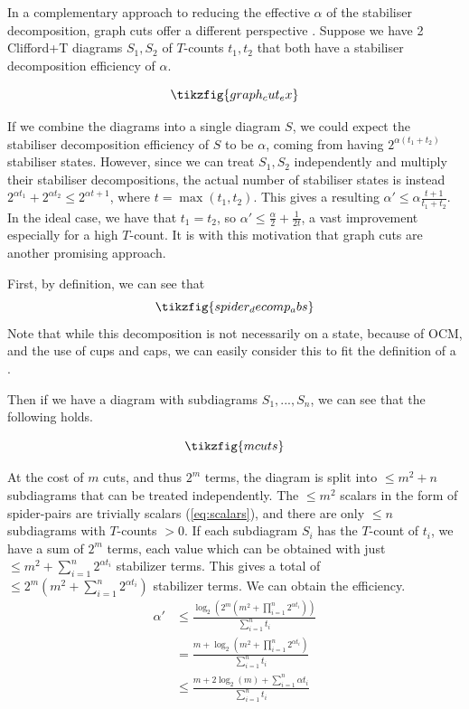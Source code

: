 In a complementary approach to reducing the effective $\alpha$ of the stabiliser decomposition, 
graph cuts offer a different perspective \cite{Codsi2022}.
Suppose we have 2 Clifford+T diagrams $S_1, S_2$ of $T$-counts $t_1,t_2$ that both 
have a stabiliser decomposition efficiency of $\alpha$.

\begin{equation}
    \label{eq:graph-cut-ex}
    \tikzfig{graph_cut_ex}
\end{equation}

If we combine the diagrams into a single diagram $S$,
we could expect the stabiliser decomposition efficiency of $S$ to be $\alpha$,
coming from having $2^{\alpha(t_1+t_2)}$ stabiliser states.
However, since we can treat $S_1,S_2$ independently and multiply their stabiliser decompositions,
the actual number of stabiliser states is instead $2^{\alpha t_1} + 2^{\alpha t_2} \leq 2^{\alpha t + 1}$,
where $t=\max(t_1,t_2)$.
This gives a resulting $\alpha' \leq \alpha \frac{t + 1}{t_1+t_2}$.
In the ideal case, we have that $t_1=t_2$, so $\alpha' \leq \frac{\alpha}{2} + \frac{1}{2t}$, 
a vast improvement especially for a high $T$-count.
It is with this motivation that graph cuts are another promising approach.

First, by definition, we can see that 
\begin{equation}
    \label{eq:spider-cut}
    \tikzfig{spider_decomp_abs}
\end{equation}
Note that while this decomposition \CutRule is not necessarily on a state,
because of OCM, and the use of cups and caps, we can easily consider this to fit 
the definition of a . 

Then if we have a diagram with subdiagrams $S_1,...,S_n$, we can see that the following holds.

\begin{equation}
    \label{eq:mcuts}
    \tikzfig{mcuts}
\end{equation}

At the cost of $m$ cuts, and thus $2^m$ terms, 
the diagram is split into $\leq m^2 + n$ subdiagrams that can be treated independently.
The $\leq m^2$ scalars in the form of spider-pairs are trivially scalars (\ref{eq:scalars}),
and there are only $\leq n$ subdiagrams with $T$-counts $>0$.
If each subdiagram $S_i$ has the $T$-count of $t_i$,
we have a sum of $2^m$ terms, each value which can be obtained with just $\leq m^2 + \sum_{i=1}^n 2^{\alpha t_i}$ stabilizer terms.
This gives a total of $\leq 2^m(m^2 + \sum_{i=1}^n 2^{\alpha t_i})$ stabilizer terms.
We can obtain the efficiency.
\begin{equation}
\begin{aligned}
    \alpha' &\leq \frac{\log_2 (2^m(m^2 + \prod_{i=1}^n 2^{\alpha t_i}))}{\sum_{i=1}^n t_i}\\
    &= \frac{m + \log_2(m^2 + \prod_{i=1}^n 2^{\alpha t_i})}{\sum_{i=1}^n t_i}\\
    &\leq \frac{m + 2\log_2(m) + \sum_{i=1}^n \alpha t_i}{\sum_{i=1}^n t_i}
\end{aligned}
\end{equation}


